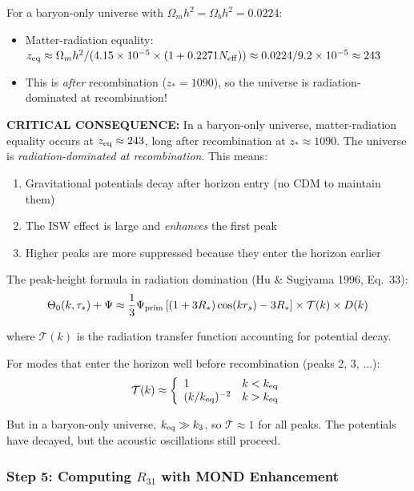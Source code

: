 \documentclass[11pt,a4paper]{article}
\begin{document}
For a baryon-only universe with $\Omega_m h^2 = \Omega_b h^2 = 0.0224$:
\begin{itemize}
\item Matter-radiation equality: $z_{\rm eq} \approx \Omega_m h^2/(4.15\times10^{-5}\times(1+0.2271 N_{\rm eff})) \approx 0.0224/9.2\times10^{-5} \approx 243$
\item This is \emph{after} recombination ($z_* = 1090$), so the universe is radiation-dominated at recombination!
\end{itemize}

\textbf{CRITICAL CONSEQUENCE:} In a baryon-only universe, matter-radiation equality occurs at $z_{\rm eq} \approx 243$, long after recombination at $z_* \approx 1090$. The universe is \emph{radiation-dominated at recombination}. This means:

\begin{enumerate}
\item Gravitational potentials decay after horizon entry (no CDM to maintain them)
\item The ISW effect is large and \emph{enhances} the first peak
\item Higher peaks are more suppressed because they enter the horizon earlier
\end{enumerate}

The peak-height formula in radiation domination (Hu \& Sugiyama 1996, Eq.\ 33):
\begin{equation}
\Theta_0(k,\tau_*) + \Psi \approx \frac{1}{3}\Psi_{\rm prim}\left[(1+3R_*)\cos(k r_s) - 3R_*\right] \times \mathcal{T}(k) \times D(k)
\end{equation}

where $\mathcal{T}(k)$ is the radiation transfer function accounting for potential decay.

For modes that enter the horizon well before recombination (peaks 2, 3, ...):
\begin{equation}
\mathcal{T}(k) \approx \left\{\begin{array}{ll} 1 & k < k_{\rm eq} \\ (k/k_{\rm eq})^{-2} & k > k_{\rm eq}\end{array}\right.
\end{equation}

But in a baryon-only universe, $k_{\rm eq} \gg k_3$, so $\mathcal{T} \approx 1$ for all peaks. The potentials have decayed, but the acoustic oscillations still proceed.

\subsubsection{Step 5: Computing $R_{31}$ with MOND Enhancement}
\end{document}
